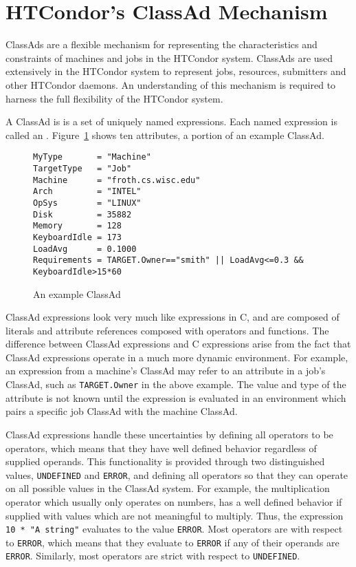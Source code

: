 \section{\label{sec:classad-reference}
HTCondor's ClassAd Mechanism}

ClassAds are a flexible mechanism for representing the characteristics and
constraints of machines and jobs in the HTCondor system.  ClassAds are used
extensively in the HTCondor system to represent jobs, resources, submitters
and other HTCondor daemons.  An understanding of this mechanism is required
to harness the full flexibility of the HTCondor system.

A ClassAd is is a set of uniquely named expressions.  Each named expression
is called an .  Figure~\ref{ClassAd:example} 
shows ten attributes,
a portion of an example ClassAd.

\begin{figure}[hbt]
\footnotesize
\begin{verbatim}
MyType       = "Machine"
TargetType   = "Job"
Machine      = "froth.cs.wisc.edu"
Arch         = "INTEL"
OpSys        = "LINUX"
Disk         = 35882
Memory       = 128
KeyboardIdle = 173
LoadAvg      = 0.1000
Requirements = TARGET.Owner=="smith" || LoadAvg<=0.3 && KeyboardIdle>15*60
\end{verbatim}
\normalsize
\caption{\label{ClassAd:example}An example ClassAd}
\end{figure}

ClassAd expressions look very much like expressions in C, and are composed
of literals and attribute references composed with operators 
and functions.
The difference
between ClassAd expressions and C expressions arise from the fact that ClassAd
expressions operate in a much more dynamic environment.  For example, an
expression from a machine's ClassAd may refer to an attribute in a job's 
ClassAd, such as \verb+TARGET.Owner+ in the above example.  The value and type 
of the attribute is not known until the expression is evaluated in an 
environment which pairs a specific job ClassAd with the machine ClassAd.

ClassAd expressions handle these uncertainties by defining all operators
to be  operators, which means that they have well defined
behavior regardless of supplied operands.  This functionality is provided
through two distinguished values, \texttt{UNDEFINED} and \texttt{ERROR},
and defining all operators so that they can operate on all possible values
in the ClassAd system.  For example, the multiplication operator which usually
only operates on numbers, has a well defined behavior if supplied with values
which are not meaningful to multiply.  Thus, the expression 
\verb+10 * "A string"+ evaluates to the value \texttt{ERROR}.  Most operators
are  with respect to \texttt{ERROR}, which means that they evaluate
to \texttt{ERROR} if any of their operands are \texttt{ERROR}.  Similarly,
most operators are strict with respect to \texttt{UNDEFINED}.

